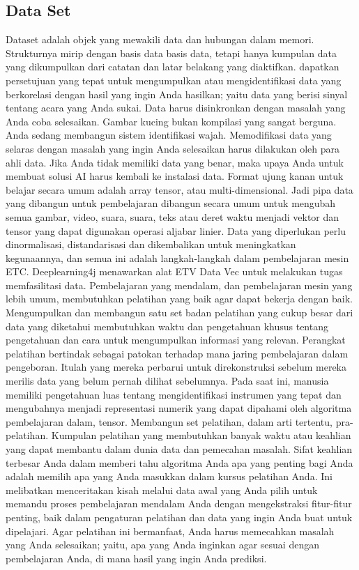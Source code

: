 \subsection{Data Set}
Dataset adalah objek yang mewakili data dan hubungan dalam memori. Strukturnya mirip dengan basis data basis data, tetapi hanya kumpulan data yang dikumpulkan dari catatan dan latar belakang yang diaktifkan. dapatkan persetujuan yang tepat untuk mengumpulkan atau mengidentifikasi data yang berkorelasi dengan hasil yang ingin Anda hasilkan; yaitu data yang berisi sinyal tentang acara yang Anda sukai. Data harus disinkronkan dengan masalah yang Anda coba selesaikan. Gambar kucing bukan kompilasi yang sangat berguna. Anda sedang membangun sistem identifikasi wajah. Memodifikasi data yang selaras dengan masalah yang ingin Anda selesaikan harus dilakukan oleh para ahli data. Jika Anda tidak memiliki data yang benar, maka upaya Anda untuk membuat solusi AI harus kembali ke instalasi data. Format ujung kanan untuk belajar secara umum adalah array tensor, atau multi-dimensional. Jadi pipa data yang dibangun untuk pembelajaran dibangun secara umum untuk mengubah semua gambar, video, suara, suara, teks atau deret waktu menjadi vektor dan tensor yang dapat digunakan operasi aljabar linier. Data yang diperlukan perlu dinormalisasi, distandarisasi dan dikembalikan untuk meningkatkan kegunaannya, dan semua ini adalah langkah-langkah dalam pembelajaran mesin ETC. Deeplearning4j menawarkan alat ETV Data Vec untuk melakukan tugas memfasilitasi data.
Pembelajaran yang mendalam, dan pembelajaran mesin yang lebih umum, membutuhkan pelatihan yang baik agar dapat bekerja dengan baik. Mengumpulkan dan membangun satu set badan pelatihan yang cukup besar dari data yang diketahui membutuhkan waktu dan pengetahuan khusus tentang pengetahuan dan cara untuk mengumpulkan informasi yang relevan. Perangkat pelatihan bertindak sebagai patokan terhadap mana jaring pembelajaran dalam pengeboran. Itulah yang mereka perbarui untuk direkonstruksi sebelum mereka merilis data yang belum pernah dilihat sebelumnya. Pada saat ini, manusia memiliki pengetahuan luas tentang mengidentifikasi instrumen yang tepat dan mengubahnya menjadi representasi numerik yang dapat dipahami oleh algoritma pembelajaran dalam, tensor. Membangun set pelatihan, dalam arti tertentu, pra-pelatihan. Kumpulan pelatihan yang membutuhkan banyak waktu atau keahlian yang dapat membantu dalam dunia data dan pemecahan masalah. Sifat keahlian terbesar Anda dalam memberi tahu algoritma Anda apa yang penting bagi Anda adalah memilih apa yang Anda masukkan dalam kursus pelatihan Anda. Ini melibatkan menceritakan kisah melalui data awal yang Anda pilih untuk memandu proses pembelajaran mendalam Anda dengan mengekstraksi fitur-fitur penting, baik dalam pengaturan pelatihan dan data yang ingin Anda buat untuk dipelajari. Agar pelatihan ini bermanfaat, Anda harus memecahkan masalah yang Anda selesaikan; yaitu, apa yang Anda inginkan agar sesuai dengan pembelajaran Anda, di mana hasil yang ingin Anda prediksi.
